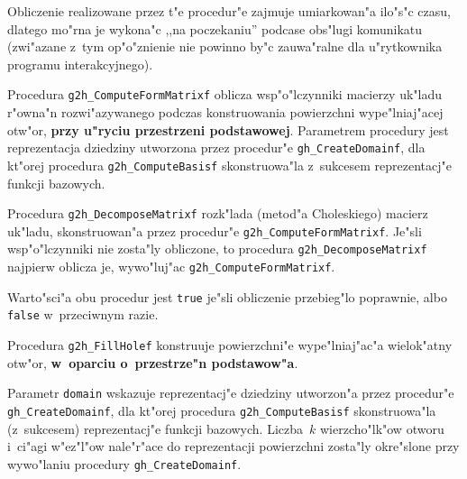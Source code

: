 Obliczenie realizowane przez t"e procedur"e zajmuje umiarkowan"a ilo"s"c czasu,
dlatego mo"rna je wykona"c ,,na poczekaniu'' podcase obs"lugi komunikatu
(zwi"azane z~tym op"o"znienie nie powinno by"c zauwa"ralne dla u"rytkownika
programu interakcyjnego).

\vspace{\bigskipamount}
\begin{sloppypar}
Procedura \texttt{g2h\_ComputeFormMatrixf} oblicza wsp"o"lczynniki macierzy
uk"ladu r"owna"n rozwi"azywanego podczas konstruowania powierzchni
wype"lniaj"acej otw"or, \textbf{przy u"ryciu przestrzeni podstawowej}.
Parametrem procedury jest reprezentacja dziedziny utworzona przez procedur"e
\texttt{gh\_CreateDomainf}, dla kt"orej procedura \texttt{g2h\_ComputeBasisf}
skonstruowa"la z~sukcesem reprezentacj"e funkcji bazowych.%
\end{sloppypar}

\vspace{\medskipamount}
\begin{sloppypar}
Procedura \texttt{g2h\_DecomposeMatrixf} rozk"lada (metod"a Choleskiego)
macierz uk"la\-du, skonstruowan"a przez procedur"e
\texttt{g2h\_ComputeFormMatrixf}. Je"sli wsp"o"lczynniki nie zosta"ly obliczone,
to procedura \texttt{g2h\_DecomposeMatrixf} najpierw oblicza je, wywo"luj"ac
\texttt{g2h\_ComputeFormMatrixf}.%
\end{sloppypar}

\vspace{\medskipamount}
Warto"sci"a obu procedur jest \texttt{true} je"sli obliczenie przebieg"lo
poprawnie, albo \texttt{false} w~przeciwnym razie.

\vspace{\bigskipamount}
\begin{sloppypar}
Procedura \texttt{g2h\_FillHolef} konstruuje powierzchni"e wype"lniaj"ac"a
wielok"atny otw"or, \textbf{w~oparciu o~przestrze"n podstawow"a}.%
\end{sloppypar}

\begin{sloppypar}
Parametr \texttt{domain} wskazuje reprezentacj"e dziedziny
utworzon"a przez procedur"e \texttt{gh\_CreateDomainf}, dla kt"orej procedura
\texttt{g2h\_ComputeBasisf} skonstruowa"la (z~sukcesem) reprezentacj"e
funkcji bazowych. Liczba~$k$ wierzcho"lk"ow otworu i~ci"agi w"ez\-"l"ow
nale"r"ace do reprezentacji powierzchni zosta"ly okre"slone przy wywo"laniu
procedury \texttt{gh\_CreateDomainf}.%
\end{sloppypar}

